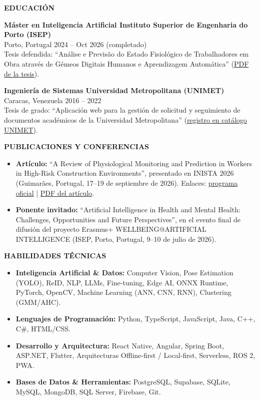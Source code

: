 \documentclass[10pt,a4paper]{article}
\newcommand{\cvsection}[1]{%
    \vspace{11pt}%
    {\large\bfseries\color{navy}#1}\par
    \vspace{2pt}{\color{accent}\rule{\linewidth}{1.2pt}}\par
    \vspace{5pt}%
}
\begin{document}
\cvsection{EDUCACIÓN}
\textbf{Máster en Inteligencia Artificial \textbar{} Instituto Superior de Engenharia do Porto (ISEP)}\\
{\color{muted}Porto, Portugal \textbar{} 2024 -- Oct 2026 (completado)}\\
Tesis defendida: ``Análise e Previsão do Estado Fisiológico de Trabalhadores em Obra através de Gémeos Digitais Humanos e Aprendizagem Automática'' (\href{https://drive.google.com/file/d/1xlqiDRtNX2Xj5_9TnHy6inUlAnseSHbF/view?usp=drive\_link}{PDF de la tesis}).

\vspace{5pt}
\textbf{Ingeniería de Sistemas \textbar{} Universidad Metropolitana (UNIMET)}\\
{\color{muted}Caracas, Venezuela \textbar{} 2016 -- 2022}\\
Tesis de grado: ``Aplicación web para la gestión de solicitud y seguimiento de documentos académicos de la Universidad Metropolitana'' (\href{https://unimet.ent.sirsi.net/client/es_ES/default/search/detailnonmodal/ent:\%24002f\%24002fSD\_ILS\%24002f0\%24002fSD\_ILS:132264/one}{registro en catálogo UNIMET}).

\cvsection{PUBLICACIONES Y CONFERENCIAS}
\begin{itemize}
    \item \textbf{Artículo:} ``A Review of Physiological Monitoring and Prediction in Workers in High-Risk Construction Environments'', presentado en INISTA 2026 (Guimarães, Portugal, 17--19 de septiembre de 2026). Enlaces: \href{https://inista2026.di.uminho.pt/pdf/INISTA\_Official\_Program.pdf}{programa oficial} | \href{https://drive.google.com/file/d/1Kh2M0t4dUh3F5vFrKY5sZMfaRxV1H2PT/view?usp=sharing}{PDF del artículo}.
    \item \textbf{Ponente invitado:} ``Artificial Intelligence in Health and Mental Health: Challenges, Opportunities and Future Perspectives'', en el evento final de difusión del proyecto Erasmus+ WELLBEING@ARTIFICIAL INTELLIGENCE (ISEP, Porto, Portugal, 9--10 de julio de 2026).
\end{itemize}

\cvsection{HABILIDADES TÉCNICAS}
\begin{itemize}
    \item \textbf{Inteligencia Artificial \& Datos:} Computer Vision, Pose Estimation (YOLO), ReID, NLP, LLMs, Fine-tuning, Edge AI, ONNX Runtime, PyTorch, OpenCV, Machine Learning (ANN, CNN, RNN), Clustering (GMM/AHC).
    \item \textbf{Lenguajes de Programación:} Python, TypeScript, JavaScript, Java, C++, C\#, HTML/CSS.
    \item \textbf{Desarrollo y Arquitectura:} React Native, Angular, Spring Boot, ASP.NET, Flutter, Arquitecturas Offline-first / Local-first, Serverless, ROS 2, PWA.
    \item \textbf{Bases de Datos \& Herramientas:} PostgreSQL, Supabase, SQLite, MySQL, MongoDB, SQL Server, Firebase, Git.
\end{itemize}
\end{document}
